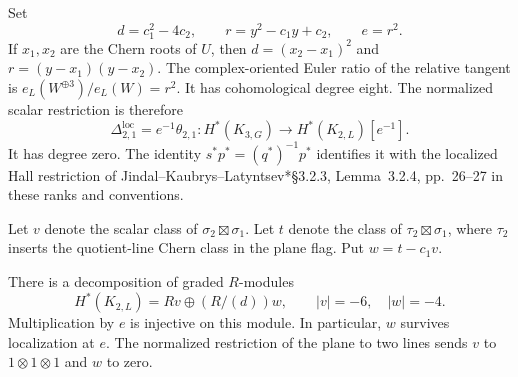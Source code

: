 Set
\begin{equation}
 d=c_1^2-4c_2,
 \qquad r=y^2-c_1y+c_2,
 \qquad e=r^2.
 \label{cr21:eq:euler}
\end{equation}
If $x_1,x_2$ are the Chern roots of $U$, then
$d=(x_2-x_1)^2$ and $r=(y-x_1)(y-x_2)$.
The complex-oriented Euler ratio of the relative tangent is
$e_L(W^{\oplus3})/e_L(W)=r^2$.
It has cohomological degree eight.
The normalized scalar restriction is therefore
\begin{equation}
 \Delta_{2,1}^{\mathrm{loc}}=e^{-1}\theta_{2,1}:
 H^*(K_{3,G})\longrightarrow H^*(K_{2,L})[e^{-1}].
 \label{cr21:eq:delta}
\end{equation}
It has degree zero.
The identity $s^*p^*=(q^*)^{-1}p^*$ identifies it with the localized
Hall restriction of Jindal--Kaubrys--Latyntsev\cite{cr11JKL}*{\S3.2.3,
Lemma~3.2.4, pp.~26--27} in these ranks and conventions.

Let $v$ denote the scalar class of $\sigma_2\boxtimes\sigma_1$.
Let $t$ denote the class of $\tau_2\boxtimes\sigma_1$, where
$\tau_2$ inserts the quotient-line Chern class in the plane flag.
Put $w=t-c_1v$.

\begin{proposition}
\label{cr21:prop:target}
There is a decomposition of graded $R$-modules
\begin{equation}
 H^*(K_{2,L})=Rv\oplus(R/(d))w,
 \qquad |v|=-6,\quad |w|=-4.
 \label{cr21:eq:module}
\end{equation}
Multiplication by $e$ is injective on this module.
In particular, $w$ survives localization at $e$.
The normalized restriction of the plane to two lines sends
$v$ to $1\otimes1\otimes1$ and $w$ to zero.
\end{proposition}

